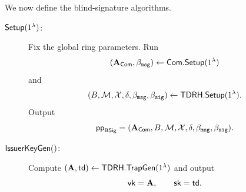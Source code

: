 We now define the blind-signature algorithms.

\begin{description}
  \item[$\mathsf{Setup}(1^\lambda)$:] Fix the global ring parameters. Run
  \[
    (\mathbf{A}_{\mathsf{Com}},\beta_{\mathtt{msg}})\gets \mathsf{Com}.\mathsf{Setup}(1^\lambda)
  \]
  and
  \[
    (B,\mathcal{M},\mathcal{X},\delta,\beta_{\mathtt{msg}},\beta_{\mathtt{sig}})\gets \mathsf{TDRH}.\mathsf{Setup}(1^\lambda).
  \]
  Output
  \[
    \mathsf{pp}_{\mathsf{BSig}}=(\mathbf{A}_{\mathsf{Com}},B,\mathcal{M},\mathcal{X},\delta,\beta_{\mathtt{msg}},\beta_{\mathtt{sig}}).
  \]

  \item[$\mathsf{IssuerKeyGen}()$:] Compute \((\mathbf{A},\mathsf{td})\gets \mathsf{TDRH}.\mathsf{TrapGen}(1^\lambda)\) and output
  \[
    \mathsf{vk}=\mathbf{A},\qquad \mathsf{sk}=\mathsf{td}.
  \]


\end{description}
